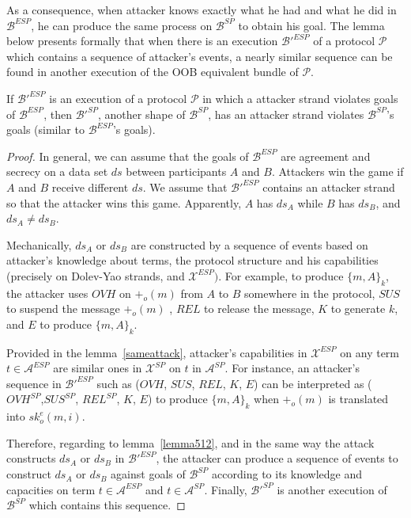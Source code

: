 As a consequence, when attacker knows exactly what he had and what he did in $\mathcal{B}^{ESP}$, he can produce the same process on $\mathcal{B}^{SP}$ to obtain his goal. The lemma below presents formally that when there is an execution $\mathcal{B'}^{ESP}$ of a protocol $\mathcal{P}$ which contains a sequence of attacker's events, a nearly similar sequence can be found in another execution of the OOB equivalent bundle of $\mathcal{P}$.

\begin{Lemma}\label{lemma514}
If $\mathcal{B'}^{ESP}$ is an execution of a protocol $\mathcal{P}$ in which a attacker strand violates goals of $\mathcal{B}^{ESP}$, then $\mathcal{B'}^{SP}$, another shape of $\mathcal{B}^{SP}$, has an attacker strand violates $\mathcal{B}^{SP}$'s goals (similar to $\mathcal{B}^{ESP}$'s goals).
\end{Lemma}

\begin{proof}
In general, we can assume that the goals of $\mathcal{B}^{ESP}$ are agreement and secrecy on a data set $ds$ between participants $A$ and $B$.  Attackers win the game if $A$ and $B$ receive different $ds$. We assume that $\mathcal{B'}^{ESP}$ contains an attacker strand so that the attacker wins this game. Apparently, $A$ has $ds_A$ while $B$ has $ds_B$, and $ds_A \not= ds_B$. 

Mechanically, $ds_A$ or $ds_B$ are constructed by a sequence of events based on attacker's knowledge about terms, the protocol structure and his capabilities (precisely on Dolev-Yao strands, and $\mathcal{X}^{ESP})$. For example, to produce $\{m,A\}_k$, the attacker uses $OVH$ on $+_o(m)$ from $A$ to $B$ somewhere in the protocol, $SUS$ to suspend the message $+_o(m)$ , $REL$ to release the message, $K$ to generate $k$, and $E$ to produce $\{m,A\}_k$. 

Provided in the lemma~\ref{sameattack}, attacker's capabilities in $\mathcal{X}^{ESP}$ on any term $t \in \mathcal{A}^{ESP}$ are similar ones in $\mathcal{X}^{SP}$ on $t$ in $\mathcal{A}^{SP}$. For instance, an attacker's sequence in $\mathcal{B'}^{ESP}$ such as ($OVH$, $SUS$, $REL$, $K$, $E$) can be interpreted as ($OVH^{SP}$,$SUS^{SP}$, $REL^{SP}$, $K$, $E$) to produce $\{m,A\}_k$ when $+_o(m)$ is translated into $sk^e_o(m,i)$. 

Therefore, regarding to lemma~\ref{lemma512}, and in the same way the attack constructs $ds_A$ or $ds_B$ in $\mathcal{B'}^{ESP}$, the attacker can produce a sequence of events to construct $ds_A$ or $ds_B$ against goals of $\mathcal{B}^{SP}$ according to its knowledge and capacities on term $t \in \mathcal{A}^{ESP}$ and $t \in \mathcal{A}^{SP}$. Finally, $\mathcal{B'}^{SP}$ is another execution of $\mathcal{B}^{SP}$ which contains this sequence.
\end{proof}

